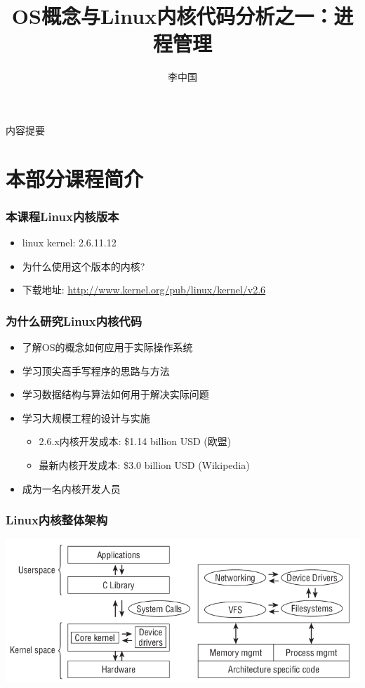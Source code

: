 \documentclass[xcolor=svgnames]{beamer}
\begin{document}
\begin{CJK*}{UTF8}{gbsn}


\title{OS概念与Linux内核代码分析之一：进程管理}
\author{李中国}

\begin{frame}
\maketitle
\end{frame}

\begin{frame}{内容提要}
\tableofcontents[pausesections]
\end{frame}

\section{本部分课程简介}

\begin{frame}[fragile]
\frametitle{本课程Linux内核版本}
\begin{itemize}
\item linux kernel: 2.6.11.12 
\item 为什么使用这个版本的内核?
\item 下载地址: \url{http://www.kernel.org/pub/linux/kernel/v2.6}
\end{itemize}
\end{frame}

\begin{frame}[fragile]%
\frametitle{为什么研究Linux内核代码}
\begin{itemize}
\item 了解OS的概念如何应用于实际操作系统
\item 学习顶尖高手写程序的思路与方法
\item 学习数据结构与算法如何用于解决实际问题
\item 学习大规模工程的设计与实施
\begin{itemize}
\item 2.6.x内核开发成本: \$1.14 billion USD (欧盟)
\item 最新内核开发成本: \$3.0 billion USD (Wikipedia)
\end{itemize}
\item 成为一名内核开发人员
\end{itemize}
\end{frame}

\begin{frame}[fragile]%
\frametitle{Linux内核整体架构}
\includegraphics[width=1.0\textwidth]{kernel.png}
\end{frame}



\end{CJK*}
\end{document}

